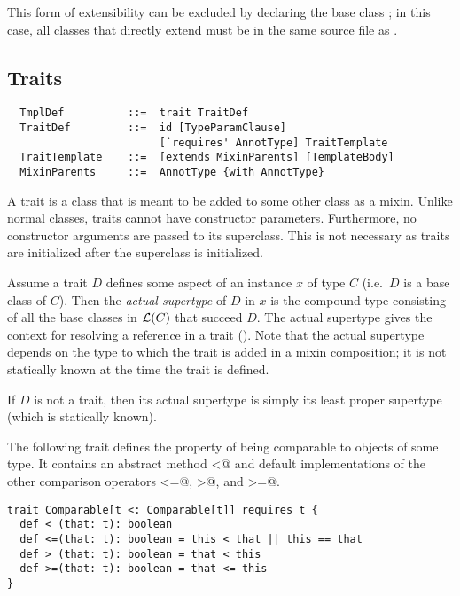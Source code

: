 This form of extensibility can be excluded by declaring the base class
 ; in this case, all classes that
directly extend  must be in the same source file as
.

\subsection{Traits}
\label{sec:traits}

\syntax\begin{lstlisting}
  TmplDef          ::=  trait TraitDef
  TraitDef         ::=  id [TypeParamClause]
                        [`requires' AnnotType] TraitTemplate
  TraitTemplate    ::=  [extends MixinParents] [TemplateBody]
  MixinParents     ::=  AnnotType {with AnnotType}
\end{lstlisting}

A trait is a class that is meant to be added to some other class
as a mixin. Unlike normal classes, traits cannot have
constructor parameters. Furthermore, no constructor arguments are
passed to its superclass. This is not necessary as traits are
initialized after the superclass is initialized.

Assume a trait $D$ defines some aspect of an instance $x$ of
type $C$ (i.e.\ $D$ is a base class of $C$). Then the {\em actual
supertype} of $D$ in $x$ is the compound type consisting of all the
base classes in ${\cal L}(C)$ that succeed $D$.  The actual supertype gives
the context for resolving a  reference in a trait
(). Note that the actual supertype depends 
on the type to which the trait is added in a mixin composition; it is not
statically known at the time the trait is defined.

If $D$ is not a trait, then its actual supertype is simply its
least proper supertype (which is statically known).

\example\label{ex:comparable} The following trait defines the property
of being comparable to objects of some type. It contains an abstract
method \lstinline@<@ and default implementations of the other
comparison operators \lstinline@<=@, \lstinline@>@, and
\lstinline@>=@. 

\begin{lstlisting}
trait Comparable[t <: Comparable[t]] requires t { 
  def < (that: t): boolean
  def <=(that: t): boolean = this < that || this == that
  def > (that: t): boolean = that < this 
  def >=(that: t): boolean = that <= this
}
\end{lstlisting}


